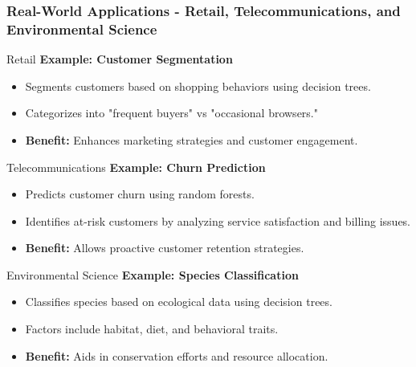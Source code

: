 \documentclass[aspectratio=169]{beamer}
\begin{document}
\begin{frame}[fragile]
    \frametitle{Real-World Applications - Retail, Telecommunications, and Environmental Science}
    \begin{block}{Retail}
        \textbf{Example: Customer Segmentation}
        \begin{itemize}
            \item Segments customers based on shopping behaviors using decision trees.
            \item Categorizes into "frequent buyers" vs "occasional browsers."
            \item \textbf{Benefit:} Enhances marketing strategies and customer engagement.
        \end{itemize}
    \end{block}
    
    \begin{block}{Telecommunications}
        \textbf{Example: Churn Prediction}
        \begin{itemize}
            \item Predicts customer churn using random forests.
            \item Identifies at-risk customers by analyzing service satisfaction and billing issues.
            \item \textbf{Benefit:} Allows proactive customer retention strategies.
        \end{itemize}
    \end{block}
    
    \begin{block}{Environmental Science}
        \textbf{Example: Species Classification}
        \begin{itemize}
            \item Classifies species based on ecological data using decision trees.
            \item Factors include habitat, diet, and behavioral traits.
            \item \textbf{Benefit:} Aids in conservation efforts and resource allocation.
        \end{itemize}
    \end{block}
\end{frame}
\end{document}
